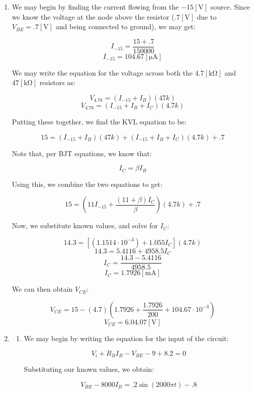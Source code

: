 \begin{enumerate}

  \item

    We may begin by finding the current flowing from the $-15[\si{\volt}]$ source. Since we know the voltage at the node above the resistor ($.7[\si{\volt}]$ due to $V_{BE}=.7[\si{\volt}]$ and being connected to ground), we may get:

    $$I_{-15}=\frac{15+.7}{150000}$$
    $$I_{-15}=104.67[\si{\micro\ampere}]$$

    We may write the equation for the voltage across both the $4.7[\si{\kilo\ohm}]$ and $47[\si{\kilo\ohm}]$ resistors as:

    $$V_{4.7k}=(I_{-15}+I_{B})(47k)$$
    $$V_{4.7k}=(I_{-15}+I_{B}+I_C)(4.7k)$$

    Putting these together, we find the KVL equation to be:

    $$15=(I_{-15}+I_B)(47k)+(I_{-15}+I_B+I_C)(4.7k)+.7$$

    Note that, per BJT equations, we know that:

    $$I_C=\beta I_B$$

    Using this, we combine the two equations to get:

    $$15=\left(11I_{-15}+\frac{(11+\beta)I_C}{\beta}\right)(4.7k)+.7$$

    Now, we substitute known values, and solve for $I_C$:

    $$14.3=[\left( 1.1514\cdot10^{-3} \right)+1.055I_C](4.7k)$$
    $$14.3=5.4116+4958.5I_C$$
    $$I_C=\frac{14.3-5.4116}{4958.5}$$
    $$\boxed{I_C=1.7926[\si{\milli\ampere}]}$$

    We can then obtain $V_{CE}$:

    $$V_{CE}=15-(4.7)\left( 1.7926+\frac{1.7926}{200}+104.67\cdot10^{-3} \right)$$
    $$\boxed{V_{CE}=6.04.07[\si{\volt}]}$$

  \item

    \begin{enumerate}

      \item 

        We may begin by writing the equation for the input of the circuit:

        $$V_{i}+R_BI_B-V_{BE}-9+8.2=0$$

        Substituting our known values, we obtain:

        $$V_{BE}-8000I_B=.2\sin(2000\pi t)-.8$$


\end{enumerate}
\end{enumerate}
